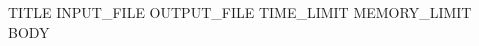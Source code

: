 \documentclass[UTF8,fontset=none,zihao=-4]{ctexart}
\begin{document}
\def\ShortProblemTitle{}
\begin{problem}{ {{TITLE}} }{ {{INPUT_FILE}} }{ {{OUTPUT_FILE}} }{ {{TIME_LIMIT}} }{ {{MEMORY_LIMIT}} }
{{BODY}}
\end{problem}
\end{document}
